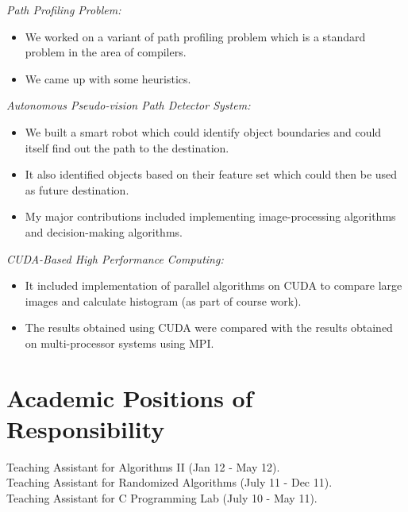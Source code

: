 \documentclass[margin,line]{resume}
\begin{document}
\begin{resume}
\vspace{-2mm}
	\textit{Path Profiling Problem:} 
	\begin{itemize}
	\item We worked on a variant of path profiling problem which is a standard problem in the area of compilers.
	\item We came up with some heuristics.
	\end{itemize}

\vspace{-2mm}
	\textit{Autonomous Pseudo-vision Path Detector System:} 
	\begin{itemize}
	\item We built a smart robot which could identify object boundaries and could itself find out the path to the destination.
	\item  It also identified objects based on their feature set which could then be used as future destination. 
	\item My major contributions included implementing image-processing algorithms and decision-making algorithms.
	\end{itemize}

\vspace{-2mm}
	\textit{CUDA-Based High Performance Computing:} 
	\begin{itemize}
	\item It included implementation of parallel algorithms on CUDA to compare large images and calculate histogram (as part of course work).
	\item The results obtained using CUDA were compared with the results obtained on multi-processor systems using MPI.
	\end{itemize}	


    \section{\mysidestyle Academic Positions of Responsibility} 
	Teaching Assistant for Algorithms II (Jan 12 - May 12).\\ 
	Teaching Assistant for Randomized Algorithms (July 11 - Dec 11).\\ 
	Teaching Assistant for C Programming Lab (July 10 - May 11).\\

\end{resume}
\end{document}
